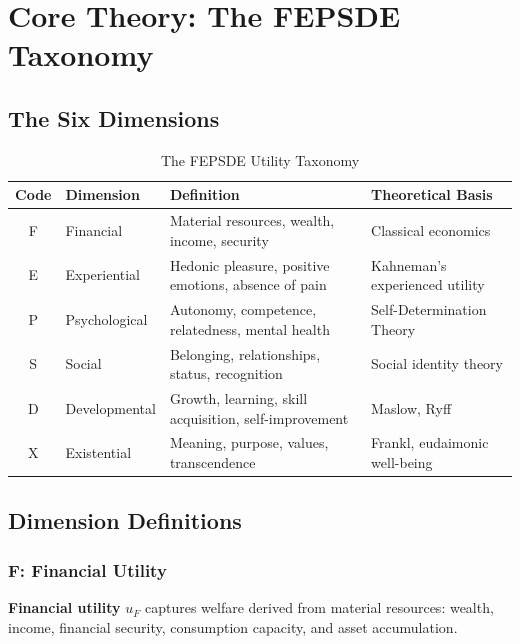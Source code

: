 \section{Core Theory: The FEPSDE Taxonomy}
\label{sec:what-fepsde}

\subsection{The Six Dimensions}

\begin{table}[htbp]
\centering
\caption{The FEPSDE Utility Taxonomy}
\label{tab:what-fepsde}
\renewcommand{\arraystretch}{1.4}
\begin{tabular}{@{}clp{5cm}l@{}}
\toprule
\textbf{Code} & \textbf{Dimension} & \textbf{Definition} & \textbf{Theoretical Basis} \\
\midrule
F & Financial & Material resources, wealth, income, security & Classical economics \\
E & Experiential & Hedonic pleasure, positive emotions, absence of pain & Kahneman's experienced utility \\
P & Psychological & Autonomy, competence, relatedness, mental health & Self-Determination Theory \\
S & Social & Belonging, relationships, status, recognition & Social identity theory \\
D & Developmental & Growth, learning, skill acquisition, self-improvement & Maslow, Ryff \\
X & Existential & Meaning, purpose, values, transcendence & Frankl, eudaimonic well-being \\
\bottomrule
\end{tabular}
\end{table}

\subsection{Dimension Definitions}

\subsubsection{F: Financial Utility}

\begin{definition}
\textbf{Financial utility} $u_F$ captures welfare derived from material resources:
wealth, income, financial security, consumption capacity, and asset accumulation.
\end{definition}

